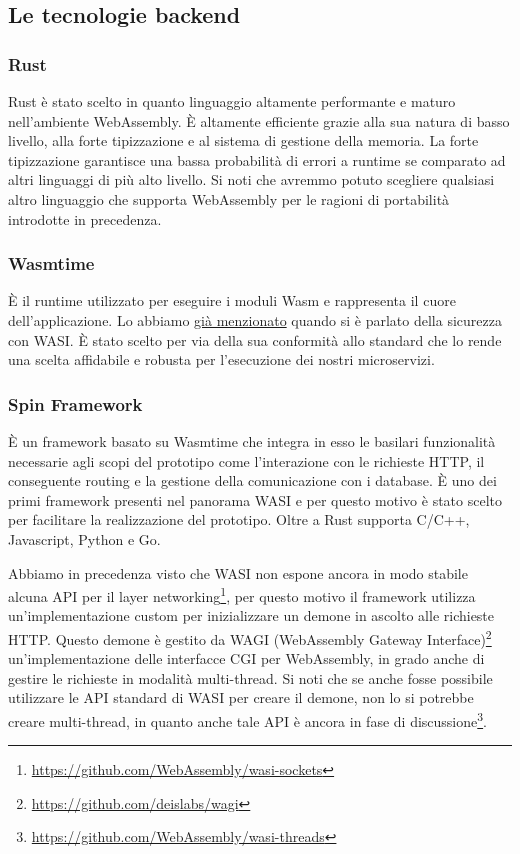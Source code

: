 \subsection{Le tecnologie backend}
\subsubsection{Rust}
Rust è stato scelto in quanto linguaggio altamente performante e maturo nell'ambiente WebAssembly. È altamente
efficiente grazie alla sua natura di basso livello, alla forte tipizzazione e al sistema di gestione della memoria. La
forte tipizzazione garantisce una bassa probabilità di errori a runtime se comparato ad altri linguaggi di più alto
livello. Si noti che avremmo potuto scegliere qualsiasi altro linguaggio che supporta WebAssembly per le ragioni di
portabilità introdotte in precedenza.

\subsubsection{Wasmtime}
È il runtime utilizzato per eseguire i moduli Wasm e rappresenta il cuore dell'applicazione. Lo abbiamo
\hyperref[sec:capability-example]{già menzionato} quando si è parlato della sicurezza con WASI. È stato scelto per via
della sua conformità allo standard che lo rende una scelta affidabile e robusta per l'esecuzione dei nostri
microservizi.

\subsubsection{Spin Framework}
\label{sec:spin-framework}
È un framework basato su Wasmtime che integra in esso le basilari funzionalità necessarie agli scopi del prototipo come
l'interazione con le richieste HTTP, il conseguente routing e la gestione della comunicazione con i database. È uno dei
primi framework presenti nel panorama WASI e per questo motivo è stato scelto per facilitare la realizzazione del
prototipo. Oltre a Rust supporta C/C++, Javascript, Python e Go.

Abbiamo in precedenza visto che WASI non espone ancora in modo stabile alcuna API per il layer
networking\footnote{\url{https://github.com/WebAssembly/wasi-sockets}}, per questo motivo il framework utilizza
un'implementazione custom per inizializzare un demone in ascolto alle richieste HTTP. Questo demone è gestito da WAGI
(WebAssembly Gateway Interface)\footnote{\url{https://github.com/deislabs/wagi}} un'implementazione delle interfacce
CGI\cite{RFC3875} per WebAssembly, in grado anche di gestire le richieste in modalità multi-thread. Si noti che se anche
fosse possibile utilizzare le API standard di WASI per creare il demone, non lo si potrebbe creare multi-thread, in
quanto anche tale API è ancora in fase di discussione\footnote{\url{https://github.com/WebAssembly/wasi-threads}}.

